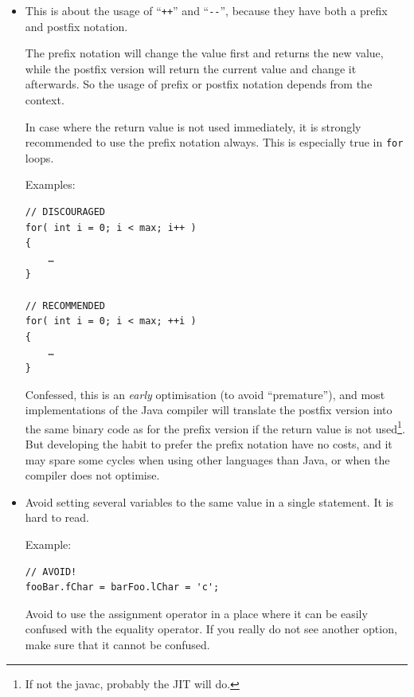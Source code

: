 \begin{itemize}
{If your code has to provide references to resources to 3\textsuperscript{rd}~party code, you should consider to protect those resources from being freed (if required). For an instance of \lstinline|PrintStream|, this could look like this:
\begin{lstlisting}
…
final var tempStream = new PrintStream( myStream ) 
{
    /**
     *  {@inheritDoc}
     */
    @Override
    public void close() { /* Does nothing! */ }
};
externalMethodWritingToPrintStream( tempStream );
…
\end{lstlisting}}


\item{This is about the usage of “\verb#++#” and “\verb#--#”, because they have both a prefix and postfix notation.

The prefix notation will change the value first and returns the new value, while the postfix version will return the current value and change it afterwards. So the usage of prefix or postfix notation depends from the context.

In case where the return value is not used immediately, it is strongly recommended to use the prefix notation always. This is especially true in \lstinline|for| loops.

Examples:
\begin{lstlisting}
// DISCOURAGED
for( int i = 0; i < max; i++ )
{
    …
}

// RECOMMENDED
for( int i = 0; i < max; ++i )
{
    …
}
\end{lstlisting}

Confessed, this is an \textit{early} optimisation (to avoid “premature”), and most implementations of the Java compiler will translate the postfix version into the same binary code as for the prefix version if the return value is not used\footnote{If not the javac, probably the JIT will do.}. But developing the habit to prefer the prefix notation have no costs, and it may spare some cycles when using other languages than Java, or when the compiler does not optimise.}\label{item:PrefixVsPostfix}

\item{Avoid setting several variables to the same value in a single statement. It is hard to read.

Example:
\begin{lstlisting}
// AVOID!
fooBar.fChar = barFoo.lChar = 'c'; 
\end{lstlisting}
Avoid to use the assignment operator in a place where it can be easily confused with the equality operator. If you really do not see another option, make sure that it cannot be confused.

}
\end{itemize}

